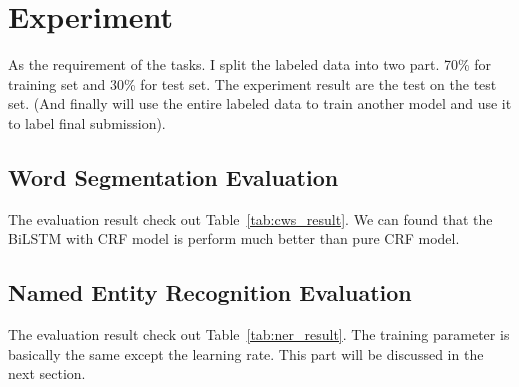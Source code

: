 \section{Experiment}
\label{sec:experiment}

As the requirement of the tasks. I split the labeled data into two part. 70\% for training set and 30\% for test set. The experiment result are the test on the test set. (And finally will use the entire labeled data to train another model and use it to label final submission).

\subsection{Word Segmentation Evaluation}
\label{sec:cws_eval}

The evaluation result check out Table~\ref{tab:cws_result}. We can found that the BiLSTM with CRF model is perform much better than pure CRF model.



\subsection{Named Entity Recognition Evaluation}
\label{sec:ner_eval}

The evaluation result check out Table~\ref{tab:ner_result}. The training parameter is basically the same except the learning rate. This part will be discussed in the next section.

